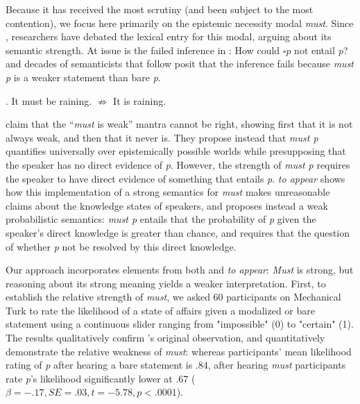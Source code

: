 \documentclass[12pt]{article}
\begin{document}
\noindent Because it has received the most scrutiny (and been subject to the most contention), we focus here primarily on the epistemic necessity modal \emph{must}. Since \citealt{karttunen1972}, researchers have debated the lexical entry for this modal, arguing about its semantic strength. At issue is the failed inference in \Next: How could $\square$\hspace{2pt}$p$ not entail \emph{p}? \citeauthor{karttunen1972} and decades of semanticists that follow posit that the inference fails because \emph{must p} is a weaker statement than bare \emph{p}.

\ex. It must be raining. \hfil $\nRightarrow$ \hfil It is raining.

\citealt{vonfintelgillies2010} claim that the ``\emph{must} is weak'' mantra cannot be right, showing first that it is not always weak, and then that it never is. They propose instead that \emph{must p} quantifies universally over epistemically possible worlds while presupposing that the speaker has no direct evidence of \emph{p}. However, the strength of \emph{must p} requires the speaker to have direct evidence of something that entails \emph{p}.  \citeauthor{lassiter2014salt} \emph{to appear} shows how this implementation of a strong semantics for \emph{must} makes unreasonable claims about the knowledge states of speakers, and proposes instead a weak probabilistic semantics: \emph{must p} entails that the probability of \emph{p} given the speaker's direct knowledge is greater than chance, and requires that the question of whether \emph{p} not be resolved by this direct knowledge.

Our approach incorporates elements from both \citealt{vonfintelgillies2010} and \citeauthor{lassiter2014salt} \emph{to appear}: \emph{Must} is strong, but reasoning about its strong meaning yields a weaker interpretation. First, to establish the relative strength of \emph{must}, we asked 60 participants on Mechanical Turk to rate the likelihood of a state of affairs given a modalized or bare statement using a continuous slider ranging from "impossible" (0) to "certain" (1). The results qualitatively confirm \citeauthor{karttunen1972}'s original observation, and quantitatively demonstrate the relative weakness of \emph{must}: whereas participants' mean likelihood rating of \emph{p} after hearing a bare statement is .84, after hearing \emph{must} %
participants rate \emph{p}'s likelihood significantly lower at .67 ($\beta=-.17, SE=.03, t=-5.78, p<.0001$). 
\end{document}
